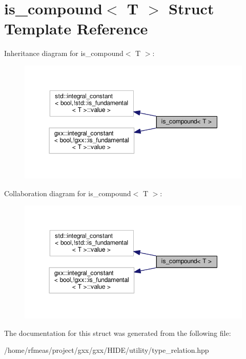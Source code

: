 \hypertarget{structis__compound}{}\section{is\+\_\+compound$<$ T $>$ Struct Template Reference}
\label{structis__compound}


Inheritance diagram for is\+\_\+compound$<$ T $>$\+:
\nopagebreak
\begin{figure}[H]
\begin{center}
\leavevmode
\includegraphics[width=350pt]{structis__compound__inherit__graph}
\end{center}
\end{figure}


Collaboration diagram for is\+\_\+compound$<$ T $>$\+:
\nopagebreak
\begin{figure}[H]
\begin{center}
\leavevmode
\includegraphics[width=350pt]{structis__compound__coll__graph}
\end{center}
\end{figure}


The documentation for this struct was generated from the following file\+:\begin{DoxyCompactItemize}
\item 
/home/rfmeas/project/gxx/gxx/\+H\+I\+D\+E/utility/type\+\_\+relation.\+hpp\end{DoxyCompactItemize}
